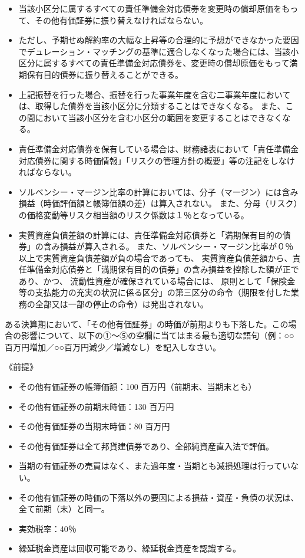 \documentclass[report,gutter=10mm,fore-edge=10mm,uplatex,dvipdfmx]{jlreq}
\begin{document}
\begin{itemize}
\tightlist
\item
  当該小区分に属するすべての責任準備金対応債券を変更時の償却原価をもって、その他有価証券に振り替えなければならない。
\item
  ただし、予期せぬ解約率の大幅な上昇等の合理的に予想ができなかった要因でデュレーション・マッチングの基準に適合しなくなった場合には、当該小区分に属するすべての責任準備金対応債券を、変更時の償却原価をもって満期保有目的債券に振り替えることができる。
\item
  上記振替を行った場合、振替を行った事業年度を含む二事業年度においては、取得した債券を当該小区分に分類することはできなくなる。
  また、この間において当該小区分を含む小区分の範囲を変更することはできなくなる。
\item
  責任準備金対応債券を保有している場合は、財務諸表において「責任準備金対応債券に関する時価情報」「リスクの管理方針の概要」等の注記をしなければならない。
\item
  ソルベンシー・マージン比率の計算においては、分子（マージン）には含み損益（時価評価額と帳簿価額の差）は算入されない。
  また、分母（リスク）の価格変動等リスク相当額のリスク係数は１％となっている。
\item
  実質資産負債差額の計算には、責任準備金対応債券と「満期保有目的の債券」の含み損益が算入される。
  また、ソルベンシー・マージン比率が０％以上で実質資産負債差額が負の場合であっても、
    実質資産負債差額から、責任準備金対応債券と「満期保有目的の債券」の含み損益を控除した額が正であり、かつ、
    流動性資産が確保されている場合には、
  原則として「保険金等の支払能力の充実の状況に係る区分」の第三区分の命令（期限を付した業務の全部又は一部の停止の命令）は発出されない。
\end{itemize}


ある決算期において、「その他有価証券」の時価が前期よりも下落した。この場合の影響について、以下の①～⑤の空欄に当てはまる最も適切な語句（例：○○百万円増加／○○百万円減少／増減なし）を記入しなさい。

《前提》 
\begin{itemize}
\item その他有価証券の帳簿価額：100 百万円（前期末、当期末とも）
\item その他有価証券の前期末時価：130 百万円
\item その他有価証券の当期末時価：80 百万円
\item その他有価証券は全て邦貨建債券であり、全部純資産直入法で評価。
\item 当期の有価証券の売買はなく、また過年度・当期とも減損処理は行っていない。
\item その他有価証券の時価の下落以外の要因による損益・資産・負債の状況は、全て前期（末）と同一。
\item 実効税率：40％
\item 繰延税金資産は回収可能であり、繰延税金資産を認識する。
\end{itemize}
\end{document}
